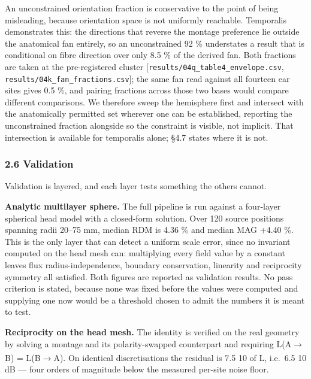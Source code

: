 \documentclass[
  11pt,
  letterpaper,
]{article}
\newcounter{none} %
\begin{document}
An unconstrained orientation fraction is conservative to the point of being
misleading, because orientation space is not uniformly reachable. Temporalis
demonstrates this: the directions that reverse the montage preference lie
outside the anatomical fan entirely, so an unconstrained 92 \% understates a
result that is conditional on fibre direction over only 8.5 \% of the derived
fan. Both fractions are taken at the pre-registered cluster
{[}\texttt{results/04q\_table4\_envelope.csv}, \texttt{results/04k\_fan\_fractions.csv}{]}; the same
fan read against all fourteen ear sites gives 0.5 \%, and pairing fractions
across those two bases would compare different comparisons. We therefore sweep
the hemisphere first and intersect with the anatomically permitted set wherever
one can be established, reporting the unconstrained fraction alongside so the
constraint is visible, not implicit. That intersection is available for
temporalis alone; \S{}4.7 states where it is not.

\subsubsection{2.6 Validation}\label{validation}

Validation is layered, and each layer tests something the others cannot.

\textbf{Analytic multilayer sphere.} The full pipeline is run against a four-layer
spherical head model with a closed-form solution. Over 120 source positions
spanning radii 20--75 mm, median RDM is 4.36 \% and median MAG +4.40 \%. This is
the only layer that can detect a uniform scale error, since no invariant
computed on the head mesh can: multiplying every field value by a constant
leaves flux radius-independence, boundary conservation, linearity and
reciprocity symmetry all satisfied. Both figures are reported as validation
results. No pass criterion is stated, because none was fixed before the values
were computed and supplying one now would be a threshold chosen to admit the
numbers it is meant to test.

\textbf{Reciprocity on the head mesh.} The identity is verified on the real geometry
by solving a montage and its polarity-swapped counterpart and requiring
L(A$\rightarrow$B) = \textminus{}L(B$\rightarrow$A). On identical discretisations the residual is 7.5 \texttimes{} 10\textsuperscript{} of
\textbar L\textbar, i.e.~6.5 \texttimes{} 10\textsuperscript{} dB --- four orders of magnitude below the measured per-site
noise floor.
\end{document}
